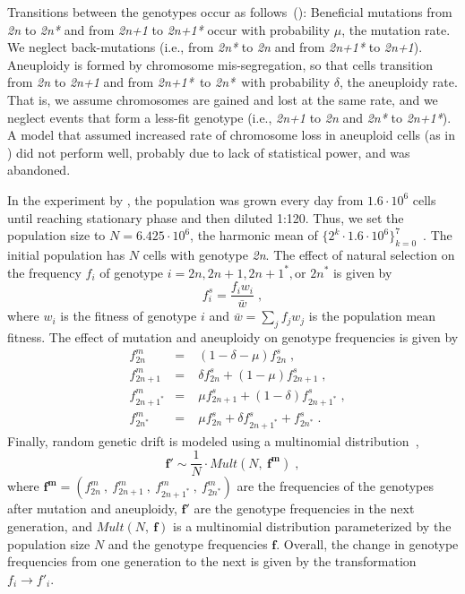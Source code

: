 \documentclass[12pt]{extarticle}
\let\vec\mathbf
\newcommand{\euwt}{\emph{2n}}
\newcommand{\anwt}{\emph{2n+1}}
\newcommand{\eumt}{\emph{2n*}}
\newcommand{\anmt}{\emph{2n+1*}}
\begin{document}
Transitions between the genotypes occur as follows~(): Beneficial mutations from \euwt\; to \eumt\; and from \anwt\; to \anmt\; occur with probability $\mu$, the mutation rate. We neglect back-mutations (i.e., from \eumt\; to \euwt\; and from \anmt\; to \anwt).
Aneuploidy is formed by chromosome mis-segregation, so that cells transition from \euwt\; to \anwt\; and from \anmt\ to \eumt\ with probability $\delta$, the aneuploidy rate. That is, we assume chromosomes are gained and lost at the same rate, and we neglect events that form a less-fit genotype (i.e., \anwt\; to \euwt\; and \eumt\; to \anmt). A model that assumed increased rate of chromosome loss in aneuploid cells (as in \citet{Sheltzer2011b}) did not perform well, probably due to lack of statistical power, and was abandoned.

In the experiment by \citet{Yona2012}, the population was grown every day from $1.6 \cdot 10^6$ cells until reaching stationary phase and then diluted 1:120.
Thus, we set the population size to $N=6.425 \cdot 10^6$, the harmonic mean of $\{2^k \cdot 1.6 \cdot 10^6\}_{k=0}^{7}$~\citep{Crow1970}.
The initial population has $N$ cells with genotype \euwt. 
The effect of natural selection on the frequency $f_i$ of genotype $i = 2n, 2n+1, 2n+1^*, \text{or } 2n^*$ is given by
    \begin{equation} \label{eq:selection-single} 
      f^s_i = \frac{f_i w_i}{\bar{w}} \;,
    \end{equation}
where $w_i$ is the fitness of genotype $i$ and $\bar{w} = \sum_{j}{f_j w_j}$ is the population mean fitness.
The effect of mutation and aneuploidy on genotype frequencies is given by
    \begin{equation} \label{eq:mutation-aneuploidy-single}
    \begin{aligned}
      &f^m_{2n} &=&\; (1 - \delta - \mu) f^s_{2n}  \;,\\
      &f^m_{2n+1} &=&\; \delta f^s_{2n} + (1 - \mu) f^s_{2n+1}  \;,\\
      &f^m_{2n+1^*} &=&\; \mu f^s_{2n+1} + (1-\delta) f^s_{2n+1^*}  \;,\\
      &f^m_{2n^*} &=&\; \mu f^s_{2n} + \delta f^s_{2n+1^*} + f^s_{2n^*}  \;.
    \end{aligned}
    \end{equation}
Finally, random genetic drift is modeled using a multinomial distribution~\citep{Otto2007},
    \begin{equation} \label{eq:drift-single}
      \vec{f'} \sim \frac{1}{N} \cdot \mathit{Mult}(N,\ \vec{f^m}) \;,
    \end{equation}
where $\vec{f^m}=(f^m_{2n}\ ,\ f^m_{2n+1}\ ,\ f^m_{2n+1^*}\ ,\ f^m_{2n^*})$ are the frequencies of the genotypes after mutation and aneuploidy, $\vec{f'}$ are the genotype frequencies in the next generation, and $Mult(N,\ \vec{f})$ is a multinomial distribution parameterized by the population size $N$ and the genotype frequencies $\vec{f}$.
Overall, the change in genotype frequencies from one generation to the next is given by the transformation $f_i \to f'_i$.
\end{document}
